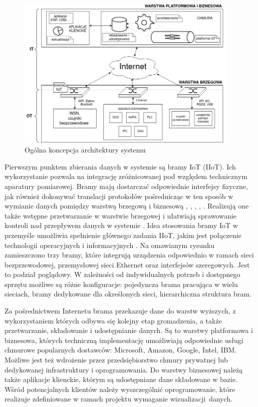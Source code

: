 \documentclass[a4paper, 12pt, twoside]{article}
\begin{document}
\begin{figure}[h]
      \centering
      \includegraphics[width=0.95\textwidth]{koncepcja.png}
      \caption{Ogólna koncepcja architektury systemu}
      \label{fig:general-idea}
\end{figure}

Pierwszym punktem zbierania danych w systemie
są bramy IoT (IIoT). Ich wykorzystanie
pozwala na integrację zróżnicowanej pod względem technicznym aparatury pomiarowej.
Bramy mają dostarczać odpowiednie interfejsy fizyczne, jak również dokonywać
translacji protokołów pośrednicząc w ten sposób w wymianie danych
pomiędzy warstwą brzegową i biznesową \cite{iiot-gateway-introduction},
\cite{iiot-heterogenous-gateways}, \cite{iot-gateway-medical-and-industrial},
\cite{modbus-iot-gateway}, \cite{iiot-design-and-impl-gateway}. Realizują one także
wstępne przetwarzanie w warstwie brzegowej i ułatwiają
sprawowanie kontroli nad przepływem danych w systemie \cite{iiot-architecture-and-gateway}.
Idea stosowania bramy IoT w przemyśle umożliwia spełnienie głównego zadania
IIoT, jakim jest połączenie technologii operacyjnych i informacyjnych
\cite{iiot-opensource-gateway}.
Na omawianym rysunku zamieszczono trzy bramy, które integrują urządzenia odpowiednio
w ramach sieci bezprzewodowej, przemysłowej sieci Ethernet oraz interfejsów szeregowych.
Jest to podział poglądowy. W zależności od indywidualnych potrzeb i dostępnego sprzętu możliwe są różne
konfiguracje: pojedyncza brama pracująca w wielu sieciach, bramy dedykowane
dla określonych sieci, hierarchiczna struktura bram.

Za pośrednictwem Internetu brama
przekazuje dane do warstw wyższych, z wykorzystaniem których odbywa się kolejny etap gromadzenia,
a także przetwarzanie, składowanie i udostępnianie danych. Są to warstwy platformowa
i biznesowa, których techniczną implementację umożliwiają odpowiednie usługi chmurowe
popularnych dostawców: Microsoft, Amazon, Google, Intel, IBM. Możliwe jest też
wdrożenie przez przedsiębiorstwo chmury prywatnej lub dedykowanej infrastruktury
i oprogramowania. Do warstwy biznesowej należą także aplikacje klienckie, którym są
udostępniane dane składowane w bazie. Wśród potencjalnych klientów należy wyszczególnić
oprogramowanie, które realizuje zdefiniowane w ramach projektu wymaganie wizualizacji~danych.
\end{document}
